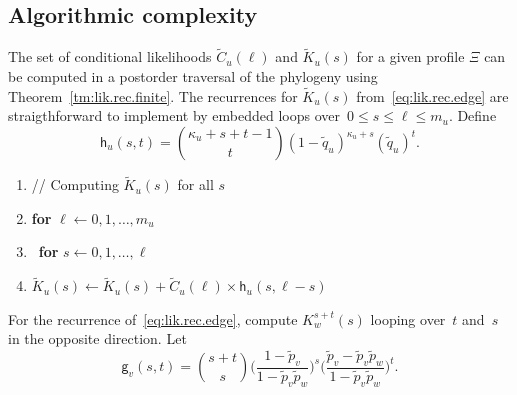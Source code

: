 \documentclass{elsarticle}
\newenvironment{fmpage}[1]
        {\begin{lrbox}{\tmpbox}\begin{minipage}{#1}}
        {\end{minipage}\end{lrbox}\fbox{\usebox{\tmpbox}}}
\newcommand{\nlik}{C}
\newcommand{\slik}{K}
\newcommand{\nx}{u}
\newcommand{\ny}{v}
\newcommand{\nz}{w}
\begin{document}
\subsection{Algorithmic complexity}
The set of conditional likelihoods 
$\tilde{\nlik}_{\nx}(\ell)$ and $\tilde{\slik}_{\nx}(s)$ 
for a given profile $\Xi$ 
can be computed in a postorder traversal of the phylogeny 
using Theorem~\ref{tm:lik.rec.finite}.  
The recurrences for $\tilde{\slik}_{\nx}(s)$ from~\eqref{eq:lik.rec.edge}
are straigthforward to implement by embedded loops
over~$0\le s\le\ell\le m_{\nx}$.
Define
\[
\mathsf{h}_{\nx}(s,t) = \binom{\kappa_{\nx}+s+t-1}{t} (1-\tilde{q}_{\nx})^{\kappa_{\nx}+s}(\tilde{q}_{\nx})^t.
\]
\begin{center}\small
\begin{fmpage}{0.8\textwidth} 
\begin{enumerate}[label=\arabic*,nosep]
\item[] // Computing $\tilde{\slik}_{\nx}(s)$ for all $s$ 
\item \textbf{for} $\ell\gets 0,1,\dotsc,m_{\nx}$
\item\quad\ \textbf{for} $s\gets 0,1,\dotsc, \ell$
\item\qquad $\tilde{\slik}_{\nx}(s) 
	\gets \tilde{\slik}_{\nx}(s)+\tilde{\nlik}_{\nx}(\ell)\times \mathsf{h}_{\nx}(s,\ell-s)$
\end{enumerate}
\end{fmpage}
\end{center} 
For the recurrence of~\eqref{eq:lik.rec.edge}, compute $\slik_{\nz}^{s+t}(s)$ 
looping over~$t$ and~$s$ in the opposite direction.
Let 
\[
\mathsf{g}_{\ny}(s,t) = 
	\binom{s+t}{s}
	\biggr(\frac{1-\tilde{p}_{\ny}}{1-\tilde{p}_{\ny}\tilde{p}_{\nz}}\biggr)^s
	\biggr(\frac{\tilde{p}_{\ny}-\tilde{p}_{\ny}\tilde{p}_{\nz}}{1-\tilde{p}_{\ny}\tilde{p}_{\nz}}\biggr)^t.
\]
\end{document}
